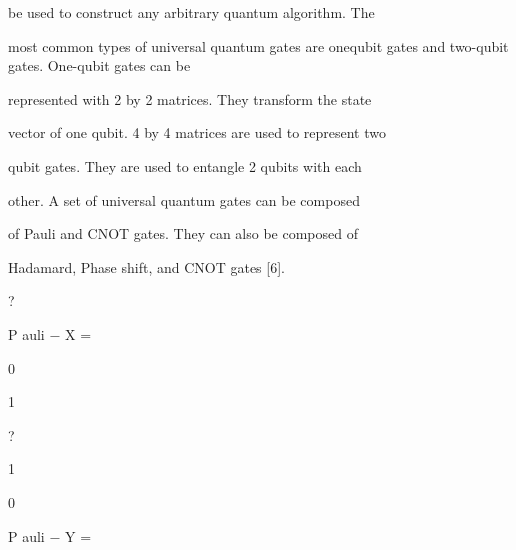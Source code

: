 \documentclass[a4paper,portrait,12pt]{article}
\begin{document}
\begin{flushleft}
be used to construct any arbitrary quantum algorithm. The
\end{flushleft}


\begin{flushleft}
most common types of universal quantum gates are onequbit gates and two-qubit gates. One-qubit gates can be
\end{flushleft}


\begin{flushleft}
represented with 2 by 2 matrices. They transform the state
\end{flushleft}


\begin{flushleft}
vector of one qubit. 4 by 4 matrices are used to represent two
\end{flushleft}


\begin{flushleft}
qubit gates. They are used to entangle 2 qubits with each
\end{flushleft}


\begin{flushleft}
other. A set of universal quantum gates can be composed
\end{flushleft}


\begin{flushleft}
of Pauli and CNOT gates. They can also be composed of
\end{flushleft}


\begin{flushleft}
Hadamard, Phase shift, and CNOT gates [6].
\end{flushleft}


?


\begin{flushleft}
P auli $-$ X =
\end{flushleft}





0


1





?


1


0





\begin{flushleft}
P auli $-$ Y =
\end{flushleft}
\end{document}
